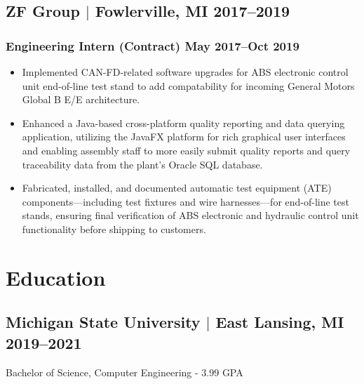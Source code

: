 \documentclass[11pt]{article}
\begin{document}
\subsection{ZF Group $|$ {\normalfont Fowlerville, MI} \hfill 2017--2019}

\subsubsection{Engineering Intern (Contract) \hfill May 2017--Oct 2019}
\begin{itemize}
  \item Implemented CAN-FD-related software upgrades for ABS electronic control 
  unit end-of-line test stand to add compatability for incoming General Motors 
  Global B E/E architecture.
  \item Enhanced a Java-based cross-platform quality reporting and data 
  querying application, utilizing the JavaFX platform for rich graphical user 
  interfaces and enabling assembly staff to more easily submit quality reports 
  and query traceability data from the plant's Oracle SQL database.
  \item Fabricated, installed, and documented automatic test equipment (ATE) 
  components—including test fixtures and wire harnesses—for end-of-line test 
  stands, ensuring final verification of ABS electronic and hydraulic control 
  unit functionality before shipping to customers.
\end{itemize}

\section{Education}
\subsection{Michigan State University $|$ {\normalfont East Lansing, MI} \hfill 2019--2021}
\noindent Bachelor of Science, Computer Engineering - 3.99 GPA
\end{document}
